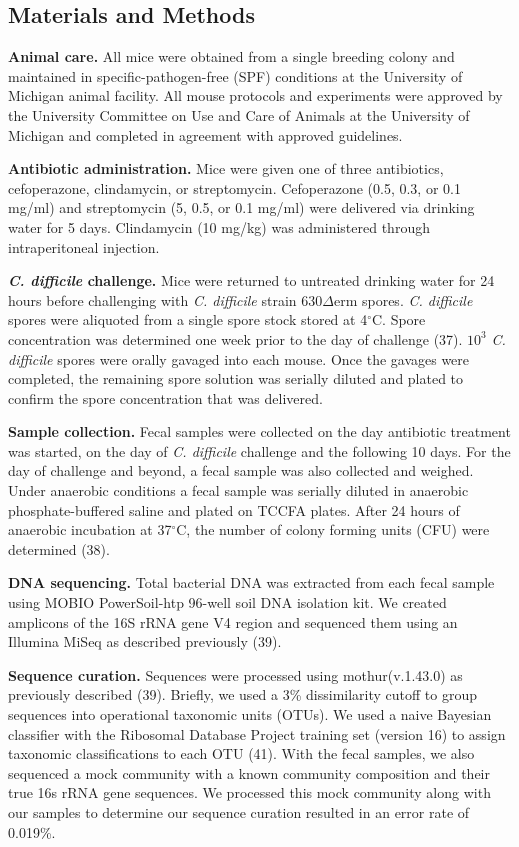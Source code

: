 \documentclass[11pt,]{article}
\begin{document}
\hypertarget{materials-and-methods}{%
\subsection{Materials and Methods}\label{materials-and-methods}}

\textbf{Animal care.} All mice were obtained from a single breeding
colony and maintained in specific-pathogen-free (SPF) conditions at the
University of Michigan animal facility. All mouse protocols and
experiments were approved by the University Committee on Use and Care of
Animals at the University of Michigan and completed in agreement with
approved guidelines.

\textbf{Antibiotic administration.} Mice were given one of three
antibiotics, cefoperazone, clindamycin, or streptomycin. Cefoperazone
(0.5, 0.3, or 0.1 mg/ml) and streptomycin (5, 0.5, or 0.1 mg/ml) were
delivered via drinking water for 5 days. Clindamycin (10 mg/kg) was
administered through intraperitoneal injection.

\textbf{\emph{C. difficile} challenge.} Mice were returned to untreated
drinking water for 24 hours before challenging with \emph{C. difficile}
strain 630\(\Delta\)erm spores. \emph{C. difficile} spores were
aliquoted from a single spore stock stored at 4\(^\circ\)C. Spore
concentration was determined one week prior to the day of challenge
(37). \(10^{3}\) \emph{C. difficile} spores were orally gavaged into
each mouse. Once the gavages were completed, the remaining spore
solution was serially diluted and plated to confirm the spore
concentration that was delivered.

\textbf{Sample collection.} Fecal samples were collected on the day
antibiotic treatment was started, on the day of \emph{C. difficile}
challenge and the following 10 days. For the day of challenge and
beyond, a fecal sample was also collected and weighed. Under anaerobic
conditions a fecal sample was serially diluted in anaerobic
phosphate-buffered saline and plated on TCCFA plates. After 24 hours of
anaerobic incubation at 37\(^\circ\)C, the number of colony forming
units (CFU) were determined (38).

\textbf{DNA sequencing.} Total bacterial DNA was extracted from each
fecal sample using MOBIO PowerSoil-htp 96-well soil DNA isolation kit.
We created amplicons of the 16S rRNA gene V4 region and sequenced them
using an Illumina MiSeq as described previously (39).

\textbf{Sequence curation.} Sequences were processed using
mothur(v.1.43.0) as previously described (39). Briefly, we used a 3\%
dissimilarity cutoff to group sequences into operational taxonomic units
(OTUs). We used a naive Bayesian classifier with the Ribosomal Database
Project training set (version 16) to assign taxonomic classifications to
each OTU (41). With the fecal samples, we also sequenced a mock
community with a known community composition and their true 16s rRNA
gene sequences. We processed this mock community along with our samples
to determine our sequence curation resulted in an error rate of 0.019\%.
\end{document}
